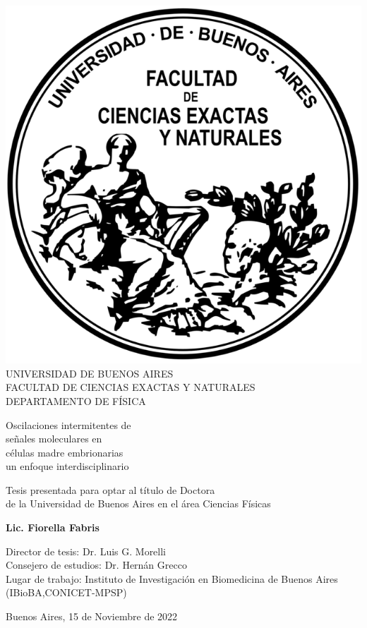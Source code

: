 \documentclass[./main.tex]{subfiles}
\begin{document}
\thispagestyle{empty}
\begin{adjustwidth}{-0.5in}{-0.5in}

{
\begin{center}
\includegraphics[scale=1]{Logo-fcenuba.png}\\
{\Large UNIVERSIDAD DE BUENOS AIRES}\\
{FACULTAD DE CIENCIAS EXACTAS Y NATURALES}\\
DEPARTAMENTO DE FÍSICA \\
\vspace{1.2cm} 

{\Huge {} Oscilaciones intermitentes de\\señales moleculares en\\células madre embrionarias}{\huge {} \\un enfoque interdisciplinario\\}
\vspace{1cm}

{\large Tesis presentada para optar al título de Doctora\\de la Universidad de Buenos Aires en el área Ciencias Físicas}\\
\vspace{0.3cm}

{\Large\textbf{Lic. Fiorella Fabris}}

\end{center}
\vspace{1cm}

{\large \noindent Director de tesis: Dr. Luis G. Morelli} \\
\noindent Consejero de estudios: Dr. Hernán Grecco \\
\noindent Lugar de trabajo: Instituto de Investigación en Biomedicina de Buenos Aires (IBioBA,CONICET-MPSP) \\
\vspace{0.3cm}

\noindent Buenos Aires, 15 de Noviembre de 2022}
\end{adjustwidth}
\end{document}
